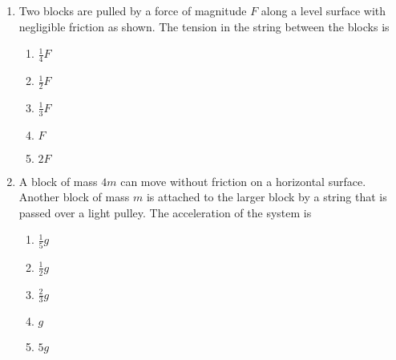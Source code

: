 \documentclass{../../../oss-apphys}
\begin{document}
\begin{multicols}{2}
\begin{enumerate}[resume,leftmargin=18pt]
  \item Two blocks are pulled by a force of magnitude $F$ along a level surface
    with negligible friction as shown. The tension in the string between the
    blocks is
    
    \begin{enumerate}[nosep,leftmargin=18pt,label=(\Alph*)]
    \item $\displaystyle\frac14F$
    \item $\displaystyle\frac12F$
    \item $\displaystyle\frac13F$
    \item $F$
    \item $2F$
    \end{enumerate}

  \item A block of mass $4m$ can move without friction on a horizontal surface.
    Another block of mass $m$ is attached to the larger block by a string that
    is passed over a light pulley. The acceleration of the system is
    \begin{enumerate}[nosep,leftmargin=18pt,label=(\Alph*)]
    \item $\displaystyle\frac15g$
    \item $\displaystyle\frac12g$
    \item $\displaystyle\frac23g$
    \item $g$
    \item $5g$
    \end{enumerate}


    
  \end{enumerate}
  \columnbreak
  

\end{multicols}
\end{document}
